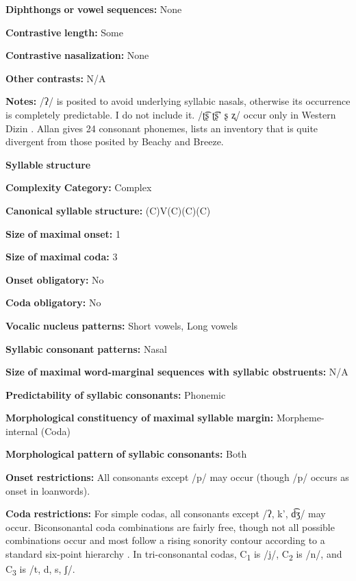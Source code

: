\textbf{Diphthongs} \textbf{or} \textbf{vowel} \textbf{sequences:} None

\textbf{Contrastive} \textbf{length:} Some

\textbf{Contrastive} \textbf{nasalization:} None

\textbf{Other} \textbf{contrasts:} N/A

\textbf{Notes:} /ʔ/ is posited to avoid underlying syllabic nasals, otherwise its occurrence is completely predictable. I do not include it. /ʈ͡ʂ ʈ͡ʂ’ ʂ ʐ/ occur only in Western Dizin \citep{Beachy2005}. Allan gives 24 consonant phonemes, lists an inventory that is quite divergent from those posited by Beachy and Breeze.

\textbf{Syllable} \textbf{structure}

\textbf{Complexity} \textbf{Category:} Complex

\textbf{Canonical} \textbf{syllable} \textbf{structure:} (C)V(C)(C)(C) \citep[38-46]{Beachy2005}

\textbf{Size} \textbf{of} \textbf{maximal} \textbf{onset:} 1

\textbf{Size} \textbf{of} \textbf{maximal} \textbf{coda:} 3

\textbf{Onset} \textbf{obligatory:} No

\textbf{Coda} \textbf{obligatory:} No

\textbf{Vocalic} \textbf{nucleus} \textbf{patterns:} Short vowels, Long vowels

\textbf{Syllabic} \textbf{consonant} \textbf{patterns:} Nasal

\textbf{Size} \textbf{of} \textbf{maximal} \textbf{word{}-marginal sequences with syllabic obstruents:} N/A

\textbf{Predictability} \textbf{of} \textbf{syllabic} \textbf{consonants:} Phonemic

\textbf{Morphological} \textbf{constituency} \textbf{of} \textbf{maximal} \textbf{syllable} \textbf{margin:} Morpheme-internal (Coda)

\textbf{Morphological} \textbf{pattern} \textbf{of} \textbf{syllabic} \textbf{consonants:} Both

\textbf{Onset} \textbf{restrictions:} All consonants except /p/ may occur (though /p/ occurs as onset in loanwords).

\textbf{Coda} \textbf{restrictions:} For simple codas, all consonants except /ʔ, k’, d͡ʒ/ may occur. Biconsonantal coda combinations are fairly free, though not all possible combinations occur and most follow a rising sonority contour according to a standard six-point hierarchy . In tri-consonantal codas, C\textsubscript{1} is /j/, C\textsubscript{2} is /n/, and C\textsubscript{3} is /t, d, s, ʃ/.

